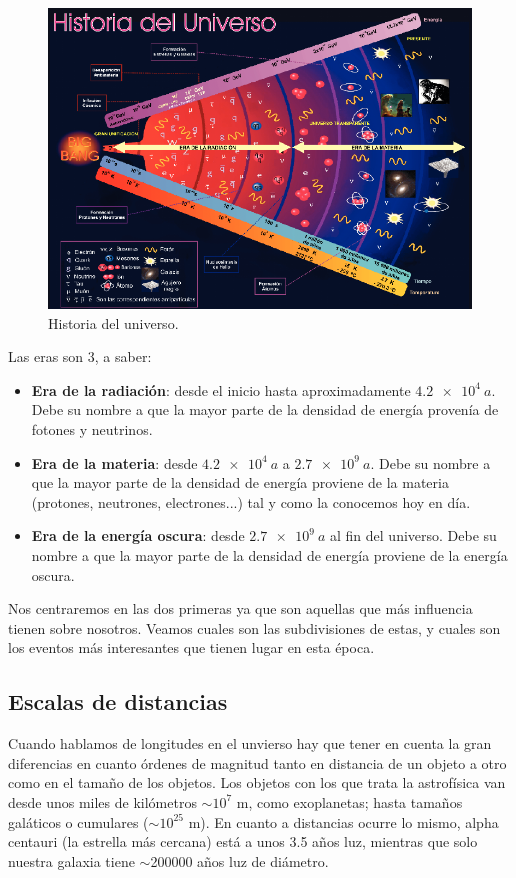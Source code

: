 \begin{figure}[h!] \centering
	\includegraphics[width=1\linewidth]{Cuerpo/Ch_03/01_Universo.png}
	\caption{Historia del universo.}
\end{figure}
Las eras son 3, a saber:
\begin{itemize}
	\item \textbf{Era de la radiación}: desde el inicio hasta aproximadamente $\SI{4.2e4}{a}$. Debe su nombre a que la mayor parte de la densidad de energía provenía de fotones y neutrinos.
	\item \textbf{Era de la materia}: desde $\SI{4.2e4}{a}$ a $\SI{2.7e9}{a}$. Debe su nombre a que la mayor parte de la densidad de energía proviene de la materia (protones, neutrones, electrones...) tal y como la conocemos hoy en día.
	\item \textbf{Era de la energía oscura}: desde $\SI{2.7e9}{a}$ al fin del universo. Debe su nombre a que la mayor parte de la densidad de energía proviene de la energía oscura.
\end{itemize}
Nos centraremos en las dos primeras ya que son aquellas que más influencia tienen sobre nosotros. Veamos cuales son las subdivisiones de estas, y cuales son los eventos más interesantes que tienen lugar en esta época.


\subsection{Escalas de distancias}

Cuando hablamos de longitudes en el unvierso hay que tener en cuenta la gran diferencias en cuanto órdenes de magnitud tanto en distancia de un objeto a otro como en el tamaño de  los objetos. Los objetos con los que trata la astrofísica van desde unos miles de kilómetros $\sim 10^{7}$ m, como exoplanetas; hasta tamaños galáticos o cumulares ($\sim 10^{25}$ m). En cuanto a distancias ocurre lo mismo, alpha centauri (la estrella más cercana) está a unos 3.5 años luz, mientras que solo nuestra galaxia tiene $\sim$200000 años luz de diámetro.

